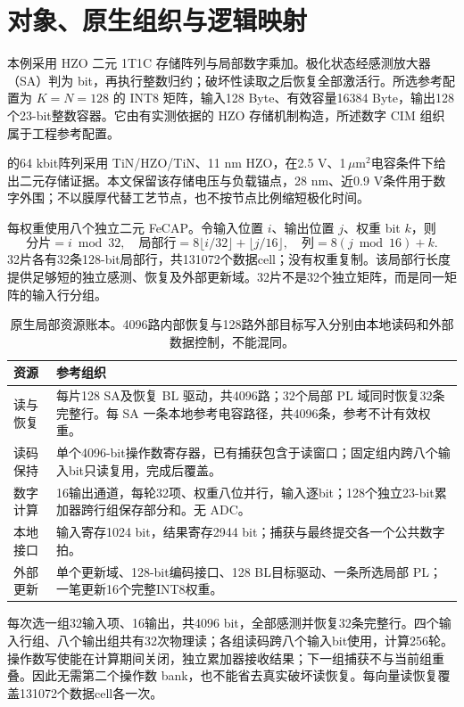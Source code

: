 \section{对象、原生组织与逻辑映射}

本例采用 HZO 二元 1T1C 存储阵列与局部数字乘加。极化状态经感测放大器（SA）判为 bit，再执行整数归约；破坏性读取之后恢复全部激活行。所选参考配置为 $K=N=128$ 的 INT8 矩阵，输入128 Byte、有效容量16384 Byte，输出128个23-bit整数容器。它由有实测依据的 HZO 存储机制构造，所述数字 CIM 组织属于工程参考配置。

 的64 kbit阵列采用 TiN/HZO/TiN、11 nm HZO，在2.5 V、1\,$\mu$m$^2$电容条件下给出二元存储证据。本文保留该存储电压与负载锚点，28 nm、近0.9 V条件用于数字外围；不以膜厚代替工艺节点，也不按节点比例缩短极化时间。\cite{feram03}

每权重使用八个独立二元 FeCAP。令输入位置 $i$、输出位置 $j$、权重 bit $k$，则
\[
\text{分片}=i\bmod32,\quad
\text{局部行}=8\lfloor i/32\rfloor+\lfloor j/16\rfloor,\quad
\text{列}=8(j\bmod16)+k.
\]
32片各有32条128-bit局部行，共131072个数据cell；没有权重复制。该局部行长度提供足够短的独立感测、恢复及外部更新域。32片不是32个独立矩阵，而是同一矩阵的输入行分组。

\begin{table}[htbp]\centering\small
\begin{tabularx}{\textwidth}{@{}p{30mm}X@{}}\toprule
资源 & 参考组织\\\midrule
读与恢复 & 每片128 SA及恢复 BL 驱动，共4096路；32个局部 PL 域同时恢复32条完整行。每 SA 一条本地参考电容路径，共4096条，参考不计有效权重。\\
读码保持 & 单个4096-bit操作数寄存器，已有捕获包含于读窗口；固定组内跨八个输入bit只读复用，完成后覆盖。\\
数字计算 & 16输出通道，每轮32项、权重八位并行，输入逐bit；128个独立23-bit累加器跨行组保存部分和。无 ADC。\\
本地接口 & 输入寄存1024 bit，结果寄存2944 bit；捕获与最终提交各一个公共数字拍。\\
外部更新 & 单个更新域、128-bit编码接口、128 BL目标驱动、一条所选局部 PL；一笔更新16个完整INT8权重。\\\bottomrule
\end{tabularx}
\caption{原生局部资源账本。4096路内部恢复与128路外部目标写入分别由本地读码和外部数据控制，不能混同。}
\end{table}

每次选一组32输入项、16输出，共4096 bit，全部感测并恢复32条完整行。四个输入行组、八个输出组共有32次物理读；各组读码跨八个输入bit使用，计算256轮。操作数写使能在计算期间关闭，独立累加器接收结果；下一组捕获不与当前组重叠。因此无需第二个操作数 bank，也不能省去真实破坏读恢复。每向量读恢复覆盖131072个数据cell各一次。

